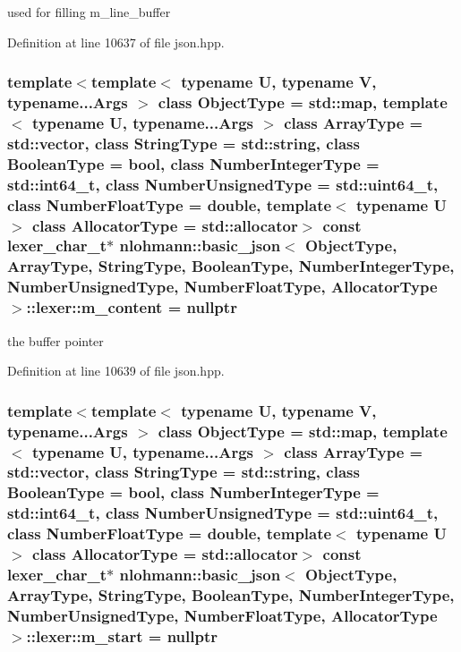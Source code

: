 used for filling m\+\_\+line\+\_\+buffer 



Definition at line 10637 of file json.\+hpp.

\hypertarget{classnlohmann_1_1basic__json_1_1lexer_ae45ff29cd065f678d9e0360ac73ca075}{}
\subsubsection[{m\+\_\+content}]{\setlength{\rightskip}{0pt plus 5cm}template$<$template$<$ typename U, typename V, typename...\+Args $>$ class Object\+Type = std\+::map, template$<$ typename U, typename...\+Args $>$ class Array\+Type = std\+::vector, class String\+Type  = std\+::string, class Boolean\+Type  = bool, class Number\+Integer\+Type  = std\+::int64\+\_\+t, class Number\+Unsigned\+Type  = std\+::uint64\+\_\+t, class Number\+Float\+Type  = double, template$<$ typename U $>$ class Allocator\+Type = std\+::allocator$>$ const {\bf lexer\+\_\+char\+\_\+t}$\ast$ {\bf nlohmann\+::basic\+\_\+json}$<$ Object\+Type, Array\+Type, String\+Type, Boolean\+Type, Number\+Integer\+Type, Number\+Unsigned\+Type, Number\+Float\+Type, Allocator\+Type $>$\+::lexer\+::m\+\_\+content = nullptr\hspace{0.3cm}{\ttfamily [private]}}\label{classnlohmann_1_1basic__json_1_1lexer_ae45ff29cd065f678d9e0360ac73ca075}


the buffer pointer 



Definition at line 10639 of file json.\+hpp.

\hypertarget{classnlohmann_1_1basic__json_1_1lexer_a7bb3cad57dba79e7474a51d9e542d841}{}
\subsubsection[{m\+\_\+start}]{\setlength{\rightskip}{0pt plus 5cm}template$<$template$<$ typename U, typename V, typename...\+Args $>$ class Object\+Type = std\+::map, template$<$ typename U, typename...\+Args $>$ class Array\+Type = std\+::vector, class String\+Type  = std\+::string, class Boolean\+Type  = bool, class Number\+Integer\+Type  = std\+::int64\+\_\+t, class Number\+Unsigned\+Type  = std\+::uint64\+\_\+t, class Number\+Float\+Type  = double, template$<$ typename U $>$ class Allocator\+Type = std\+::allocator$>$ const {\bf lexer\+\_\+char\+\_\+t}$\ast$ {\bf nlohmann\+::basic\+\_\+json}$<$ Object\+Type, Array\+Type, String\+Type, Boolean\+Type, Number\+Integer\+Type, Number\+Unsigned\+Type, Number\+Float\+Type, Allocator\+Type $>$\+::lexer\+::m\+\_\+start = nullptr\hspace{0.3cm}{\ttfamily [private]}}\label{classnlohmann_1_1basic__json_1_1lexer_a7bb3cad57dba79e7474a51d9e542d841}


